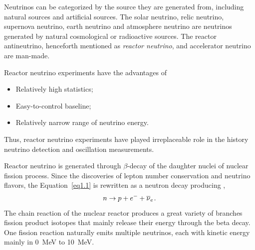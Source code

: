 \label{Ch2}

    Neutrinos can be categorized by the source they are generated from, including natural sources and artificial sources.
    The solar neutrino, relic neutrino, supernova neutrino, earth neutrino and atmosphere neutrino are neutrinos generated by natural cosmological or radioactive sources.
    The reactor antineutrino, henceforth mentioned as \textit{reactor neutrino}, and accelerator neutrino are man-made.
    
    Reactor neutrino experiments have the advantages of
    \begin{itemize}
        \item Relatively high statistics;
        \item Easy-to-control baseline;
        \item Relatively narrow range of neutrino energy.
    \end{itemize}
    Thus, reactor neutrino experiments have played irreplaceable role in the history neutrino detection and oscillation measurements.
    
    
    Reactor neutrino is \nuebar generated through $\beta$-decay of the daughter nuclei of nuclear fission process.
    Since the discoveries of lepton number conservation and neutrino flavors, the Equation~\ref{eq1.1} is rewritten as a neutron decay producing \nuebar,
    \begin{equation}\label{eq2.1}
        n \rightarrow p + e^- + \overline{\nu }_{e}\hspace{1pt}.
    \end{equation}
    The chain reaction of the nuclear reactor produces a great variety of branches fission product isotopes that mainly release their energy through the beta decay.
    One fission reaction naturally emits multiple neutrinos, each with kinetic energy mainly in 0~MeV to 10~MeV.
    

